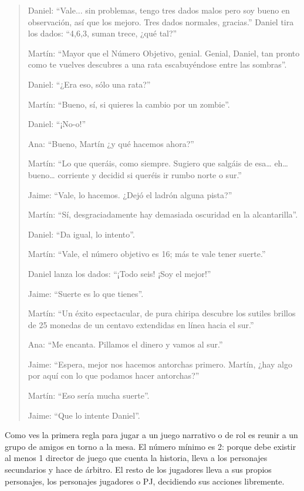 \begin{quotation}
Daniel: \enquote{Vale... sin problemas, tengo tres dados malos pero soy bueno en observación, así que los mejoro. Tres dados normales, gracias.} Daniel tira los dados: \enquote{4,6,3, suman trece, ¿qué tal?}

Martín: \enquote{Mayor que el Número Objetivo, genial. Genial, Daniel, tan pronto como te vuelves descubres a una rata escabuyéndose entre las sombras}.

Daniel: \enquote{¿Era eso, sólo una rata?}

Martín: \enquote{Bueno, sí, si quieres la cambio por un zombie}.

Daniel: \enquote{¡No-o!}

Ana: \enquote{Bueno, Martín ¿y qué hacemos ahora?}

Martín: \enquote{Lo que queráis, como siempre. Sugiero que salgáis de esa… eh… bueno… corriente y decidid si queréis ir rumbo norte o sur.}

Jaime: \enquote{Vale, lo hacemos. ¿Dejó el ladrón alguna pista?}

Martín: \enquote{Sí, desgraciadamente hay demasiada oscuridad en la alcantarilla}.

Daniel: \enquote{Da igual, lo intento}.

Martín: \enquote{Vale, el número objetivo es 16; más te vale tener suerte.}

Daniel lanza los dados: \enquote{¡Todo seis! ¡Soy el mejor!}

Jaime: \enquote{Suerte es lo que tienes}.

Martín: \enquote{Un éxito espectacular, de pura chiripa descubre los sutiles brillos de 25 monedas de un centavo extendidas en línea hacia el sur.}

Ana: \enquote{Me encanta. Pillamos el dinero y vamos al sur.}

Jaime: \enquote{Espera, mejor nos hacemos antorchas primero. Martín, ¿hay algo por aquí con lo que podamos hacer antorchas?}

Martín: \enquote{Eso sería mucha suerte}.

Jaime: \enquote{Que lo intente Daniel}.

\end{quotation}


Como ves la primera regla para jugar a un juego narrativo o de rol es reunir a un grupo de amigos en torno a la mesa. El número mínimo es 2: porque debe existir al menos 1 director de juego que cuenta la historia, lleva a los personajes secundarios y hace de árbitro. El resto de los jugadores lleva a sus propios personajes, los personajes jugadores o PJ, decidiendo sus acciones libremente.


